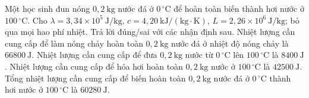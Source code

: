 \begin{ex}
Một học sinh đun nóng $0{,}2\ \mathrm{kg}$ nước đá ở $0\,^{\circ}\mathrm{C}$ để hoàn toàn biến thành hơi nước ở $100\,^{\circ}\mathrm{C}$. Cho $\lambda=3{,}34\times10^5\ \mathrm{J/kg}$, $c=4{,}20\ \mathrm{kJ/(kg\cdot K)}$, $L=2{,}26\times10^6\ \mathrm{J/kg}$; bỏ qua mọi hao phí nhiệt. Trả lời đúng/sai với các nhận định sau.
\choiceTF
{\True Nhiệt lượng cần cung cấp để làm nóng chảy hoàn toàn $0{,}2\ \mathrm{kg}$ nước đá ở nhiệt độ nóng chảy là $66800\ \mathrm{J}$.}
{Nhiệt lượng cần cung cấp để đưa $0{,}2\ \mathrm{kg}$ nước từ $0\,^{\circ}\mathrm{C}$ lên $100\,^{\circ}\mathrm{C}$ là $8400\ \mathrm{J}$.}
{Nhiệt lượng cần cung cấp để hóa hơi hoàn toàn $0{,}2\ \mathrm{kg}$ nước ở $100\,^{\circ}\mathrm{C}$ là $42500\ \mathrm{J}$.}
{Tổng nhiệt lượng cần cung cấp để biến hoàn toàn $0{,}2\ \mathrm{kg}$ nước đá ở $0\,^{\circ}\mathrm{C}$ thành hơi nước ở $100\,^{\circ}\mathrm{C}$ là $60280\ \mathrm{J}$.}
\end{ex}
